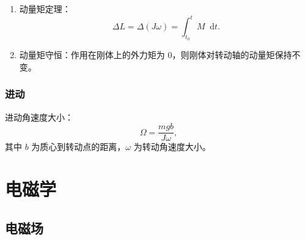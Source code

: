 \documentclass[UTF8,fontset=fandol,zihao=5]{ctexart}
\newcommand{\dif}{\mathop{}\!\mathrm{d}}
\begin{document}
\begin{enumerate}
  \item 动量矩定理：
  \[
    \Delta L=\Delta(J\omega)=\int_{t_0}^{t}M\dif t.
  \]
  \item 动量矩守恒：作用在刚体上的外力矩为 0，则刚体对转动轴的动量矩保持不变。
\end{enumerate}

\subsubsection{进动}

进动角速度大小：
\[
  \Omega=\frac{mgb}{J\omega},
\]
其中 \(b\) 为质心到转动点的距离，\(\omega\) 为转动角速度大小。

\section{电磁学}

\subsection{电磁场}
\end{document}
